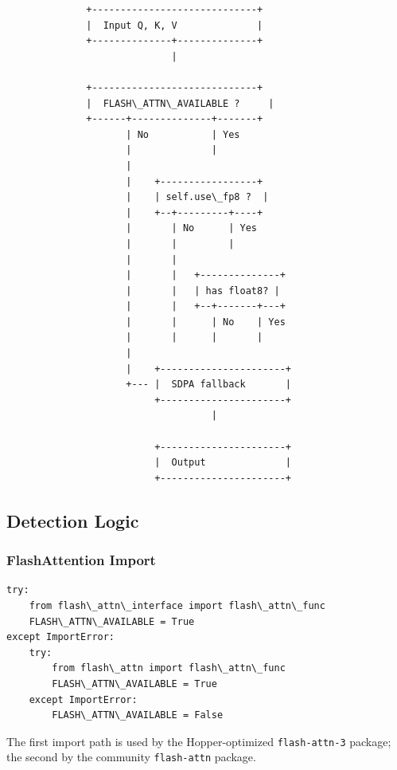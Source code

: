 \begin{lstlisting}
              +-----------------------------+
              |  Input Q, K, V              |
              +--------------+--------------+
                             |
                              
              +-----------------------------+
              |  FLASH\_ATTN\_AVAILABLE ?     |
              +------+--------------+-------+
                     | No           | Yes
                     |              |
                     |               
                     |    +-----------------+
                     |    | self.use\_fp8 ?  |
                     |    +--+---------+----+
                     |       | No      | Yes
                     |       |         |
                     |       |          
                     |       |   +--------------+
                     |       |   | has float8? |
                     |       |   +--+-------+---+
                     |       |      | No    | Yes
                     |       |      |       |
                     |                       
                     |    +----------------------+
                     +--- |  SDPA fallback       |
                          +----------------------+
                                    |
                                     
                          +----------------------+
                          |  Output              |
                          +----------------------+
\end{lstlisting}

\subsection{Detection Logic}

\subsubsection{FlashAttention Import}

\begin{lstlisting}
try:
    from flash\_attn\_interface import flash\_attn\_func
    FLASH\_ATTN\_AVAILABLE = True
except ImportError:
    try:
        from flash\_attn import flash\_attn\_func
        FLASH\_ATTN\_AVAILABLE = True
    except ImportError:
        FLASH\_ATTN\_AVAILABLE = False
\end{lstlisting}

The first import path is used by the Hopper-optimized \texttt{flash-attn-3} package; 
the second by the community \texttt{flash-attn} package.

